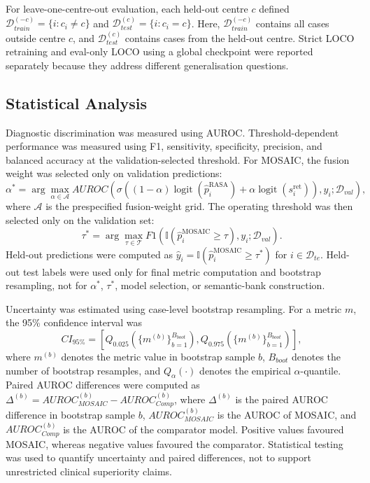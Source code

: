 \documentclass[11pt, a4paper]{article}
\theoremstyle{plain}
\theoremstyle{definition}
\begin{document}
For leave-one-centre-out evaluation, each held-out centre \(c\) defined \(\mathcal{D}_{train}^{(-c)}=\{i:c_i\neq c\}\) and \(\mathcal{D}_{test}^{(c)}=\{i:c_i=c\}\). Here, \(\mathcal{D}_{train}^{(-c)}\) contains all cases outside centre \(c\), and \(\mathcal{D}_{test}^{(c)}\) contains cases from the held-out centre. Strict LOCO retraining and eval-only LOCO using a global checkpoint were reported separately because they address different generalisation questions.

\subsection{Statistical Analysis}
\label{subsec:methods_statistics}

Diagnostic discrimination was measured using AUROC. Threshold-dependent performance was measured using F1, sensitivity, specificity, precision, and balanced accuracy at the validation-selected threshold. For MOSAIC, the fusion weight was selected only on validation predictions:
\begin{equation}
\alpha^*
=
\arg\max_{\alpha\in\mathcal{A}}
AUROC\left(
\sigma((1-\alpha)\operatorname{logit}(\hat{p}_i^{\mathrm{RASA}})
+\alpha\operatorname{logit}(s_i^{\mathrm{ret}})),y_i;\mathcal{D}_{val}
\right),
\end{equation}
where \(\mathcal{A}\) is the prespecified fusion-weight grid. The operating threshold was then selected only on the validation set:
\begin{equation}
\tau^{*}
=
\arg\max_{\tau\in\mathcal{T}}
F1(\mathbb{I}(\hat{p}_i^{\mathrm{MOSAIC}}\geq\tau),y_i;\mathcal{D}_{val}).
\end{equation}
Held-out predictions were computed as \(\hat{y}_i=\mathbb{I}(\hat{p}_i^{\mathrm{MOSAIC}}\geq\tau^{*})\) for \(i\in\mathcal{D}_{te}\). Held-out test labels were used only for final metric computation and bootstrap resampling, not for \(\alpha^*\), \(\tau^*\), model selection, or semantic-bank construction.

Uncertainty was estimated using case-level bootstrap resampling. For a metric \(m\), the 95\% confidence interval was
\begin{equation}
CI_{95\%}
=
\left[
Q_{0.025}\left(\{m^{(b)}\}_{b=1}^{B_{boot}}\right),
Q_{0.975}\left(\{m^{(b)}\}_{b=1}^{B_{boot}}\right)
\right],
\end{equation}
where \(m^{(b)}\) denotes the metric value in bootstrap sample \(b\), \(B_{boot}\) denotes the number of bootstrap resamples, and \(Q_{\alpha}(\cdot)\) denotes the empirical \(\alpha\)-quantile. Paired AUROC differences were computed as \(\Delta^{(b)}=AUROC_{MOSAIC}^{(b)}-AUROC_{Comp}^{(b)}\), where \(\Delta^{(b)}\) is the paired AUROC difference in bootstrap sample \(b\), \(AUROC_{MOSAIC}^{(b)}\) is the AUROC of MOSAIC, and \(AUROC_{Comp}^{(b)}\) is the AUROC of the comparator model. Positive values favoured MOSAIC, whereas negative values favoured the comparator. Statistical testing was used to quantify uncertainty and paired differences, not to support unrestricted clinical superiority claims.
\end{document}
